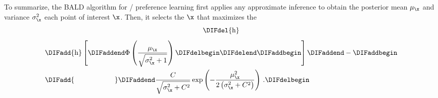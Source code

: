 To summarize, the BALD algorithm for \DIFdelbegin {}\DIFdelend \DIFaddbegin {}\DIFaddend / preference learning first applies
any approximate inference \DIFdelbegin {}\DIFdelend \DIFaddbegin {}\DIFaddend to obtain the posterior \DIFdelbegin {}\DIFdelend mean
$\mu_{\x}$ and variance $\sigma_{\x}^2$ \DIFdelbegin {}\DIFdelend \DIFaddbegin {}\DIFaddend each point of interest $\x$. Then, it selects the
\DIFdelbegin {}\DIFdelend \DIFaddbegin {}\DIFaddend $\x$ that maximizes the \DIFdelbegin {}%
\begin{displaymath}%
\DIFdel{\mathrm{h} }%
\end{displaymath}%
\DIFdelend \DIFaddbegin {}\begin{align}
& \DIFadd{\mathrm{h} }\left[ \DIFaddend \Phi\left(  \frac{\mu_{\x}}{\sqrt{\sigma^2_{\x} + 1}} \right)\DIFdelbegin %
\DIFdelend \DIFaddbegin \right] \DIFaddend -\DIFaddbegin \notag \\
& \DIFadd{\hspace{2cm} }\DIFaddend \frac{C}{\sqrt{\sigma_{\x}^2 + C^2}} \exp\left(-\frac{\mu_{\x}^2}{2\left(\sigma_{\x}^2 + C^2\right)}\right)\,.\label{eqn:BALD}
\DIFdelbegin %
\end{align}%


